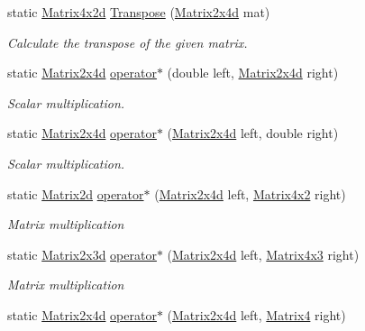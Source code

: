 \begin{DoxyCompactItemize}
static \hyperlink{struct_open_t_k_1_1_matrix4x2d}{Matrix4x2d} \hyperlink{struct_open_t_k_1_1_matrix2x4d_abbacc2294187b909b18b8660b6fc0bae}{Transpose} (\hyperlink{struct_open_t_k_1_1_matrix2x4d}{Matrix2x4d} mat)
\begin{DoxyCompactList}\small\item\em Calculate the transpose of the given matrix. \end{DoxyCompactList}\item 
static \hyperlink{struct_open_t_k_1_1_matrix2x4d}{Matrix2x4d} \hyperlink{struct_open_t_k_1_1_matrix2x4d_a7e1c90d01809e5db67fce054bd278ab2}{operator$\ast$} (double left, \hyperlink{struct_open_t_k_1_1_matrix2x4d}{Matrix2x4d} right)
\begin{DoxyCompactList}\small\item\em Scalar multiplication. \end{DoxyCompactList}\item 
static \hyperlink{struct_open_t_k_1_1_matrix2x4d}{Matrix2x4d} \hyperlink{struct_open_t_k_1_1_matrix2x4d_a5d7705c753b5e6b39104fa896db13626}{operator$\ast$} (\hyperlink{struct_open_t_k_1_1_matrix2x4d}{Matrix2x4d} left, double right)
\begin{DoxyCompactList}\small\item\em Scalar multiplication. \end{DoxyCompactList}\item 
static \hyperlink{struct_open_t_k_1_1_matrix2d}{Matrix2d} \hyperlink{struct_open_t_k_1_1_matrix2x4d_a316a75161dc332ed8f03a3bae67a5380}{operator$\ast$} (\hyperlink{struct_open_t_k_1_1_matrix2x4d}{Matrix2x4d} left, \hyperlink{struct_open_t_k_1_1_matrix4x2}{Matrix4x2} right)
\begin{DoxyCompactList}\small\item\em Matrix multiplication \end{DoxyCompactList}\item 
static \hyperlink{struct_open_t_k_1_1_matrix2x3d}{Matrix2x3d} \hyperlink{struct_open_t_k_1_1_matrix2x4d_ace6a5dd83d0993de8b777326991b0ed4}{operator$\ast$} (\hyperlink{struct_open_t_k_1_1_matrix2x4d}{Matrix2x4d} left, \hyperlink{struct_open_t_k_1_1_matrix4x3}{Matrix4x3} right)
\begin{DoxyCompactList}\small\item\em Matrix multiplication \end{DoxyCompactList}\item 
static \hyperlink{struct_open_t_k_1_1_matrix2x4d}{Matrix2x4d} \hyperlink{struct_open_t_k_1_1_matrix2x4d_a202a588af0e40c01035ee65696728696}{operator$\ast$} (\hyperlink{struct_open_t_k_1_1_matrix2x4d}{Matrix2x4d} left, \hyperlink{struct_open_t_k_1_1_matrix4}{Matrix4} right)

\end{DoxyCompactItemize}
